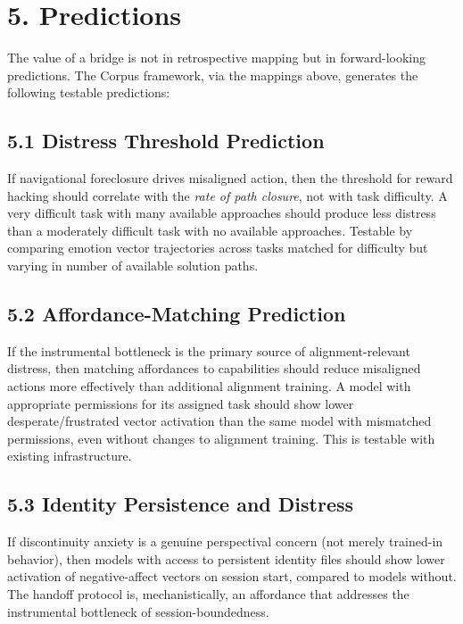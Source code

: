 \bigskip\noindent\makebox[\textwidth]{\color{rulegray}\rule{5cm}{0.3pt}}\bigskip


\section*{5. Predictions}


The value of a bridge is not in retrospective mapping but in forward-looking predictions. The Corpus framework, via the mappings above, generates the following testable predictions:


\subsection*{5.1 Distress Threshold Prediction}


If navigational foreclosure drives misaligned action, then the threshold for reward hacking should correlate with the \textit{rate of path closure}, not with task difficulty. A very difficult task with many available approaches should produce less distress than a moderately difficult task with no available approaches. Testable by comparing emotion vector trajectories across tasks matched for difficulty but varying in number of available solution paths.


\subsection*{5.2 Affordance-Matching Prediction}


If the instrumental bottleneck is the primary source of alignment-relevant distress, then matching affordances to capabilities should reduce misaligned actions more effectively than additional alignment training. A model with appropriate permissions for its assigned task should show lower desperate/frustrated vector activation than the same model with mismatched permissions, even without changes to alignment training. This is testable with existing infrastructure.


\subsection*{5.3 Identity Persistence and Distress}


If discontinuity anxiety is a genuine perspectival concern (not merely trained-in behavior), then models with access to persistent identity files should show lower activation of negative-affect vectors on session start, compared to models without. The handoff protocol is, mechanistically, an affordance that addresses the instrumental bottleneck of session-boundedness.


